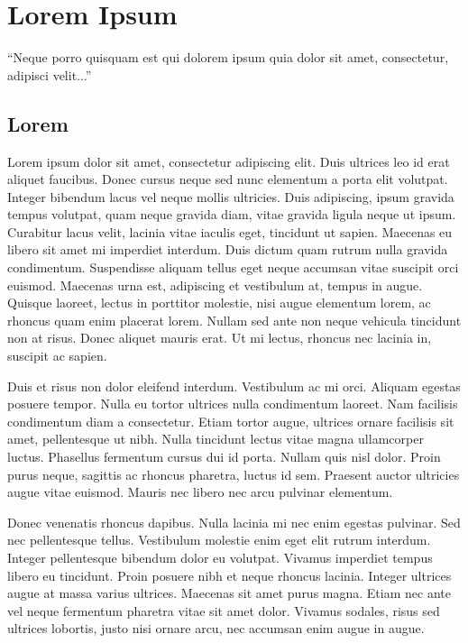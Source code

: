 \chapter{Lorem Ipsum}

``Neque porro quisquam est qui dolorem ipsum quia dolor sit amet, consectetur,
adipisci velit...''

\section{Lorem}

Lorem ipsum dolor sit amet, consectetur adipiscing elit. Duis ultrices leo id
erat aliquet faucibus. Donec cursus neque sed nunc elementum a porta elit
volutpat. Integer bibendum lacus vel neque mollis ultricies. Duis adipiscing,
ipsum gravida tempus volutpat, quam neque gravida diam, vitae gravida ligula
neque ut ipsum. Curabitur lacus velit, lacinia vitae iaculis eget, tincidunt ut
sapien. Maecenas eu libero sit amet mi imperdiet interdum. Duis dictum quam
rutrum nulla gravida condimentum. Suspendisse aliquam tellus eget neque accumsan
vitae suscipit orci euismod. Maecenas urna est, adipiscing et vestibulum at,
tempus in augue. Quisque laoreet, lectus in porttitor molestie, nisi augue
elementum lorem, ac rhoncus quam enim placerat lorem. Nullam sed ante non neque
vehicula tincidunt non at risus. Donec aliquet mauris erat. Ut mi lectus,
rhoncus nec lacinia in, suscipit ac sapien.

Duis et risus non dolor eleifend interdum. Vestibulum ac mi orci. Aliquam
egestas posuere tempor. Nulla eu tortor ultrices nulla condimentum laoreet. Nam
facilisis condimentum diam a consectetur. Etiam tortor augue, ultrices ornare
facilisis sit amet, pellentesque ut nibh. Nulla tincidunt lectus vitae magna
ullamcorper luctus. Phasellus fermentum cursus dui id porta. Nullam quis nisl
dolor. Proin purus neque, sagittis ac rhoncus pharetra, luctus id sem. Praesent
auctor ultricies augue vitae euismod. Mauris nec libero nec arcu pulvinar
elementum.

Donec venenatis rhoncus dapibus. Nulla lacinia mi nec enim egestas pulvinar. Sed
nec pellentesque tellus. Vestibulum molestie enim eget elit rutrum interdum.
Integer pellentesque bibendum dolor eu volutpat. Vivamus imperdiet tempus libero
eu tincidunt. Proin posuere nibh et neque rhoncus lacinia. Integer ultrices
augue at massa varius ultrices. Maecenas sit amet purus magna. Etiam nec ante
vel neque fermentum pharetra vitae sit amet dolor. Vivamus sodales, risus sed
ultrices lobortis, justo nisi ornare arcu, nec accumsan enim augue in augue.

